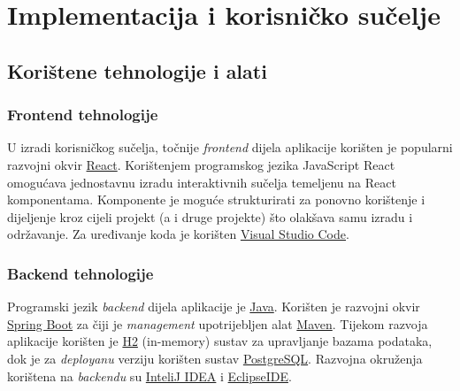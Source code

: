 \chapter{Implementacija i korisničko sučelje}
		
		
		\section{Korištene tehnologije i alati}
		
			
			
			\subsection{Frontend tehnologije}
            U izradi korisničkog sučelja, točnije \textit{frontend} dijela aplikacije korišten je popularni razvojni okvir \href{https://reactjs.org}{React}. Korištenjem programskog jezika JavaScript React omogućava jednostavnu izradu interaktivnih sučelja temeljenu na React komponentama. Komponente je moguće strukturirati za ponovno korištenje i dijeljenje kroz cijeli projekt (a i druge projekte) što olakšava samu izradu i održavanje. Za uređivanje koda je korišten \href{https://code.visualstudio.com}{Visual Studio Code}.
            \subsection{Backend tehnologije}
			 
		Programski jezik \textit{backend} dijela aplikacije je \href{https://www.java.com/en/download/help/whatis_java.html}{Java}. Korišten je razvojni okvir \href{https://spring.io/projects/spring-boot}{Spring Boot} za čiji je \textit{management} upotrijebljen alat \href{https://maven.apache.org}{Maven}. Tijekom razvoja aplikacije korišten je \href{https://www.h2database.com}{H2} (in-memory) sustav za upravljanje bazama podataka, dok je za \textit{deployanu} verziju korišten sustav \href{https://www.postgresql.org}{PostgreSQL}. Razvojna okruženja korištena na \textit{backendu} su \href{https://www.jetbrains.com/idea/}{InteliJ IDEA} i \href{https://www.eclipse.org}{EclipseIDE}.

